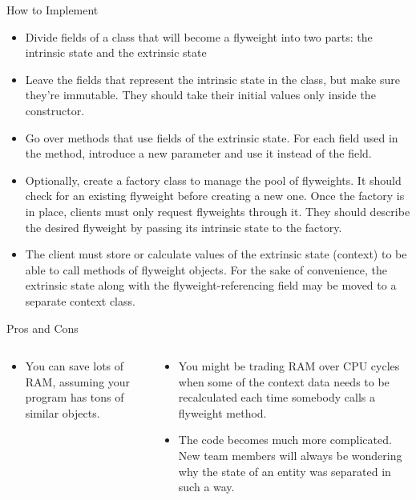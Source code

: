 \documentclass[13pt]{beamer}
\begin{document}
\begin{frame}{How to Implement}
	\begin{itemize}
		\setlength\itemsep{1em}
		\item Divide fields of a class that will become a flyweight into two parts: the intrinsic state and the extrinsic state
		\item Leave the fields that represent the intrinsic state in the class, but make sure they’re immutable. They should take their initial values only inside the constructor.
		\item Go over methods that use fields of the extrinsic state. For each field used in the method, introduce a new parameter and use it instead of the field.
		\item Optionally, create a factory class to manage the pool of flyweights. It should check for an existing flyweight before creating a new one. Once the factory is in place, clients must only request flyweights through it. They should describe the desired flyweight by passing its intrinsic state to the factory.
		\item The client must store or calculate values of the extrinsic state (context) to be able to call methods of flyweight objects. For the sake of convenience, the extrinsic state along with the flyweight-referencing field may be moved to a separate context class.
	\end{itemize}
\end{frame}

\begin{frame}{Pros and Cons}
	\begin{columns}[T]
		\begin{column}{.5\textwidth}
			\begin{itemize}
				\item You can save lots of RAM, assuming your program has tons of similar objects.
			\end{itemize}
		\end{column}
	
		\begin{column}{.5\textwidth}
			\begin{itemize}
				\item You might be trading RAM over CPU cycles when some of the context data needs to be recalculated each time somebody calls a flyweight method.
				\item The code becomes much more complicated. New team members will always be wondering why the state of an entity was separated in such a way.
			\end{itemize}
		\end{column}
	\end{columns}
\end{frame}
\end{document}
